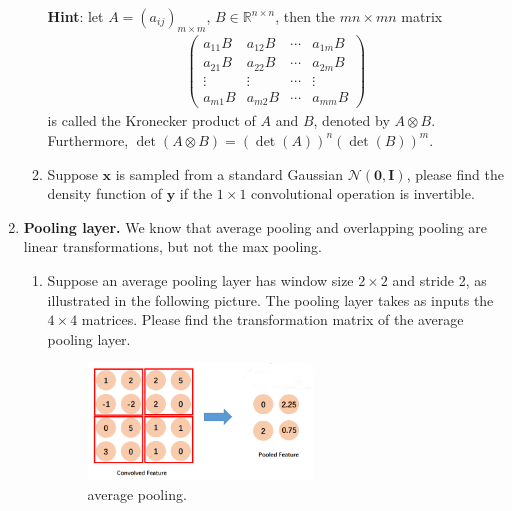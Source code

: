 \documentclass[11pt,letter,notitlepage]{article}
\begin{document}
\begin{exercise}
\begin{enumerate}
\begin{enumerate}
          \textbf{Hint}: let $A=\left(a_{i j}\right)_{m \times m}$, $B\in\mathbb{R}^{n \times n}$, then the $m n \times m n$ matrix
          \begin{align*}
            \left(\begin{array}{cccc}
            a_{11} B & a_{12} B & \cdots & a_{1 m} B \\
            a_{21} B & a_{22} B & \cdots & a_{2 m} B \\
            \vdots & \vdots & \cdots & \vdots \\
            a_{m 1} B & a_{m 2} B & \cdots & a_{m m} B
            \end{array}\right)
          \end{align*}
          is called the Kronecker product of $A$ and $B$, denoted by $ A \otimes B$. Furthermore, $\operatorname{det}(A \otimes B)=(\operatorname{det}(A))^{n}(\operatorname{det}(B))^{m}$.

      \item Suppose $\mathbf{x}$ is sampled from a standard Gaussian $\mathcal{N}(\mathbf{0},\mathbf{I})$, please find the density function of $\mathbf{y}$ if the $1\times1$ convolutional operation is  invertible.

    \end{enumerate}
    \item \textbf{Pooling layer.} We know that average pooling and overlapping pooling are linear transformations, but not the max pooling.
        \begin{enumerate}
          \item Suppose an average pooling layer has window size $2\times2$ and stride 2, as illustrated in the following picture. The pooling layer takes as inputs the $4\times4 $ matrices.  Please find the transformation matrix of the average pooling layer.
                \begin{figure}[H]
                  \centering
                  \includegraphics[width=0.6\textwidth]{Figures/pooling.png}
                  \caption{average pooling.}
                \end{figure}


\end{enumerate}
\end{enumerate}
\end{exercise}
\end{document}

